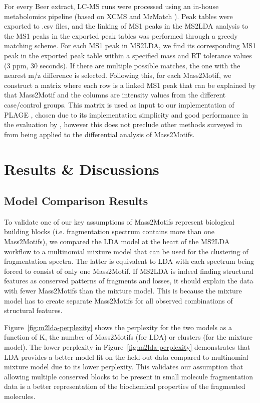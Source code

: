 For every Beer extract, LC-MS runs were processed using an in-house metabolomics pipeline (based on XCMS \cite{Smith2006} and MzMatch \cite{Scheltema2011}). Peak tables were exported to .csv files, and the linking of MS1 peaks in the MS2LDA analysis to the MS1 peaks in the exported peak tables was performed through a greedy matching scheme. For each MS1 peak in MS2LDA, we find its corresponding MS1 peak in the exported peak table within a specified mass and RT tolerance values (3 ppm, 30 seconds). If there are multiple possible matches, the one with the nearest m/z difference is selected. Following this, for each Mass2Motif, we construct a matrix where each row is a linked MS1 peak that can be explained by that Mass2Motif and the columns are intensity values from the different case/control groups. This matrix is used as input to our implementation of PLAGE \cite{tomfohr2005pathway}, chosen due to its implementation simplicity and good performance in the evaluation by \cite{tarca2013comparison}, however this does not preclude other methods surveyed in \cite{tarca2013comparison} from being applied to the differential analysis of Mass2Motifs.

\section{Results \& Discussions}

\subsection{Model Comparison Results\label{sub:lda-model-comparison}}

To validate one of our key assumptions of Mass2Motifs represent biological building blocks (i.e. fragmentation spectrum contains more than one Mass2Motifs), we compared the LDA model at the heart of the MS2LDA workflow to a multinomial mixture model that can be used for the clustering of fragmentation spectra. The latter is equivalent to LDA with each spectrum being forced to consist of only one Mass2Motif. If MS2LDA is indeed finding structural features as conserved patterns of fragments and losses, it should explain the data with fewer Mass2Motifs than the mixture model. This is because the mixture model has to create separate Mass2Motifs for all observed combinations of structural features. 

Figure~\ref{fig:m2lda-perplexity} shows the perplexity for the two models as a function of K, the number of Mass2Motifs (for LDA) or clusters (for the mixture model). The lower perplexity in Figure~\ref{fig:m2lda-perplexity} demonstrates that LDA provides a better model fit on the held-out data compared to multinomial mixture model due to its lower perplexity. This validates our assumption that allowing multiple conserved blocks to be present in small molecule fragmentation data is a better representation of the biochemical properties of the fragmented molecules.

